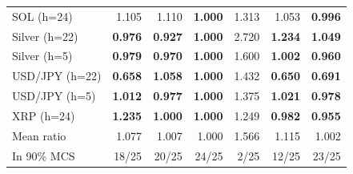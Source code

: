 \begin{tabular}{lrrrrrr}
SOL (h=24) & 1.105 & 1.110 & \textbf{1.000} & 1.313 & 1.053 & \textbf{0.996}\\
Silver (h=22) & \textbf{0.976} & \textbf{0.927} & \textbf{1.000} & 2.720 & \textbf{1.234} & \textbf{1.049}\\
Silver (h=5) & \textbf{0.979} & \textbf{0.970} & \textbf{1.000} & 1.600 & \textbf{1.002} & \textbf{0.960}\\
USD/JPY (h=22) & \textbf{0.658} & \textbf{1.058} & \textbf{1.000} & 1.432 & \textbf{0.650} & \textbf{0.691}\\
USD/JPY (h=5) & \textbf{1.012} & \textbf{0.977} & \textbf{1.000} & 1.375 & \textbf{1.021} & \textbf{0.978}\\
XRP (h=24) & \textbf{1.235} & \textbf{1.000} & \textbf{1.000} & 1.249 & \textbf{0.982} & \textbf{0.955}\\
\addlinespace Mean ratio & 1.077 & 1.007 & 1.000 & 1.566 & 1.115 & 1.002\\
In 90\% MCS & 18/25 & 20/25 & 24/25 & 2/25 & 12/25 & 23/25\\
\bottomrule
\end{tabular}
